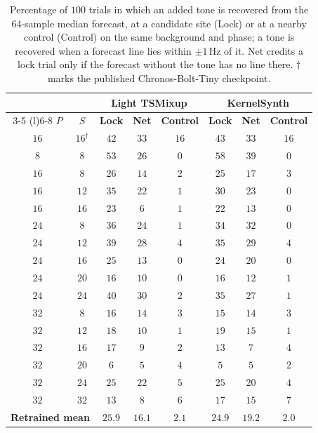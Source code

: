 \begin{table}[!p]
    \centering
    \small
    \setlength{\tabcolsep}{4.5pt}
    \renewcommand{\arraystretch}{1.15}
    \begin{tabular}{@{}cccccccc@{}}
        \toprule
        & & \multicolumn{3}{c}{\textbf{Light TSMixup}} & \multicolumn{3}{c}{\textbf{KernelSynth}} \\
        \cmidrule(lr){3-5} \cmidrule(l){6-8}
        \textbf{$P$} & \textbf{$S$} & \textbf{Lock} & \textbf{Net} & \textbf{Control} & \textbf{Lock} & \textbf{Net} & \textbf{Control} \\
        \midrule
        $16$ & $16^{\dagger}$ & $42$ & $33$ & $16$ & $43$ & $33$ & $16$ \\
        \midrule
        $8$ & $8$ & $53$ & $26$ & $0$ & $58$ & $39$ & $0$ \\
        \midrule
        $16$ & $8$ & $26$ & $14$ & $2$ & $25$ & $17$ & $3$ \\
        $16$ & $12$ & $35$ & $22$ & $1$ & $30$ & $23$ & $0$ \\
        $16$ & $16$ & $23$ & $6$ & $1$ & $22$ & $13$ & $0$ \\
        \midrule
        $24$ & $8$ & $36$ & $24$ & $1$ & $34$ & $32$ & $0$ \\
        $24$ & $12$ & $39$ & $28$ & $4$ & $35$ & $29$ & $4$ \\
        $24$ & $16$ & $25$ & $13$ & $0$ & $24$ & $20$ & $0$ \\
        $24$ & $20$ & $16$ & $10$ & $0$ & $16$ & $12$ & $1$ \\
        $24$ & $24$ & $40$ & $30$ & $2$ & $35$ & $27$ & $1$ \\
        \midrule
        $32$ & $8$ & $16$ & $14$ & $3$ & $15$ & $14$ & $3$ \\
        $32$ & $12$ & $18$ & $10$ & $1$ & $19$ & $15$ & $1$ \\
        $32$ & $16$ & $17$ & $9$ & $2$ & $13$ & $7$ & $4$ \\
        $32$ & $20$ & $6$ & $5$ & $4$ & $5$ & $5$ & $2$ \\
        $32$ & $24$ & $25$ & $22$ & $5$ & $25$ & $20$ & $4$ \\
        $32$ & $32$ & $13$ & $8$ & $6$ & $17$ & $15$ & $7$ \\
        \midrule
        \multicolumn{2}{c}{\textbf{Retrained mean}} & $25.9$ & $16.1$ & $2.1$ & $24.9$ & $19.2$ & $2.0$ \\
        \bottomrule
    \end{tabular}
\caption{Percentage of $100$ trials in which an added tone is recovered from the $64$-sample median forecast, at a candidate site (Lock) or at a nearby control (Control) on the same background and phase; a tone is recovered when a forecast line lies within $\pm1$\,Hz of it. Net credits a lock trial only if the forecast without the tone has no line there.\newline
$\dagger$ marks the published Chronos-Bolt-Tiny checkpoint.}%
    \label{tab:decomposition}
\end{table}
